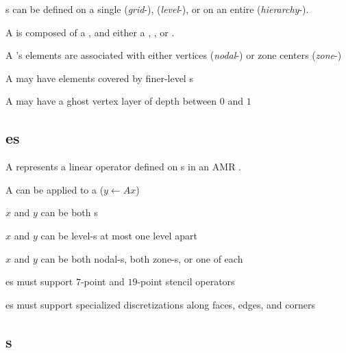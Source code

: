 \documentclass[11pt]{article}
\begin{document}
\BeginENUMERATE
\item {}s can be defined on a single  (\textit{grid}-),  (\textit{level}-), or on an entire  (\textit{hierarchy}-).
\item A  is composed of a , and either a , , or .
\item A 's elements are associated with either  vertices (\textit{nodal}-) or  zone centers (\textit{zone}-)
\item A  may have elements covered by finer-level s
\item A  may have a ghost vertex layer of depth between $0$ and $1$ 
\EndENUMERATE

\subsection{es}  \label{ss:matrix}

A  represents a linear operator defined on s in an AMR .

\BeginENUMERATE
\item A  can be applied to a  ($y \leftarrow A x$)
\item $x$ and $y$ can be both  s
\item $x$ and $y$ can be level-s at most one level apart
\item $x$ and $y$ can be both nodal-s, both zone-s, or one of each
\item {}es must support $7$-point and $19$-point stencil operators
\item {}es must support specialized discretizations along  faces, edges, and corners
\EndENUMERATE

\subsection{s} \label{ss:solver}
\end{document}
